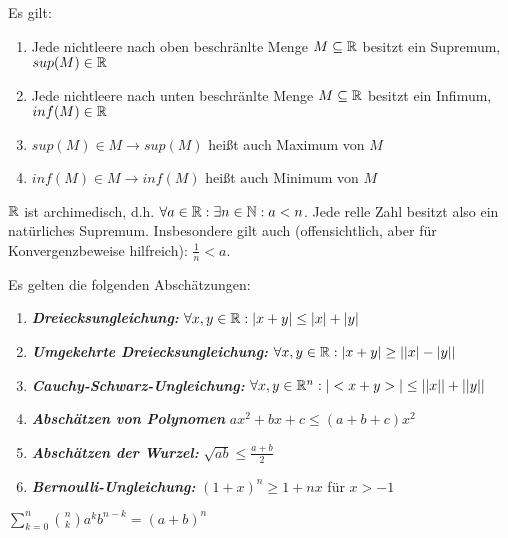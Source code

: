 \begin{satz}[Supremumsaxiom]
	Es gilt:
	\begin{enumerate}[noitemsep]
		\item Jede nichtleere nach oben beschränlte Menge $M \subseteq \mathbb{R}$ besitzt ein Supremum, $sup(M) \in \mathbb{R}$
		\item Jede nichtleere nach unten beschränlte Menge $M \subseteq \mathbb{R}$ besitzt ein Infimum, $inf(M) \in \mathbb{R}$
		\item $sup(M) \in M \rightarrow sup(M)$ heißt auch Maximum von $M$
		\item $inf(M) \in M \rightarrow inf(M)$ heißt auch Minimum von $M$
	\end{enumerate}
\end{satz}

\begin{satz}[Archimedizität]
	$\mathbb{R}$ ist archimedisch, d.h. $\forall a \in \mathbb{R} : \exists n \in \mathbb{N} : a < n $. Jede relle Zahl besitzt also ein natürliches Supremum. Insbesondere gilt auch (offensichtlich, aber für Konvergenzbeweise hilfreich): $\frac{1}{n} < a$.
\end{satz}

\begin{satz}[Abschätzungen]
	Es gelten die folgenden Abschätzungen:
	
	\begin{enumerate}[noitemsep]
		\item \textbf{\emph{Dreiecksungleichung:}} $\forall x,y \in \mathbb{R} : | x + y | \leq |x| + |y|$
		\item \textbf{\emph{Umgekehrte Dreiecksungleichung:}} 	$\forall x,y \in \mathbb{R} : | x + y | \geq ||x| - |y||$
		\item \textbf{\emph{Cauchy-Schwarz-Ungleichung:}} 	$\forall x,y \in \mathbb{R}^n : | <x + y> | \leq ||x|| + ||y||$
		\item \textbf{\emph{Abschätzen von Polynomen}} 	$ax^2 + bx + c \leq (a + b + c)x^2 $
		\item \textbf{\emph{Abschätzen der Wurzel:}} 	$\sqrt{ab} \leq \frac{a + b}{2}$
		\item \textbf{\emph{Bernoulli-Ungleichung:}} 	$(1+x)^n \geq 1 + nx$ für $x > -1$	
	\end{enumerate}
	
\end{satz}

\begin{satz}
	$\sum_{k=0}^{n} \binom{n}{k}a^k b^{n-k} = (a+b)^n$ 
\end{satz}


